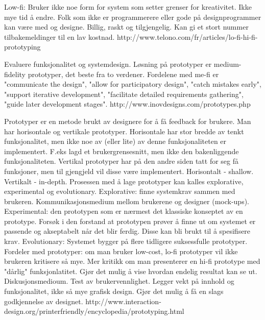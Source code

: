 Low-fi: Bruker ikke noe form for system som setter grenser for kreativitet. Ikke mye tid å endre. Folk som ikke er programmerere eller gode på designprogrammer kan være med og designe. Billig, raskt og tilgjengelig. Kan gi et stort nummer tilbakemeldinger til en lav kostnad. http://www.telono.com/fr/articles/lo-fi-hi-fi-prototyping

Evaluere funksjonalitet og systemdesign. Løsning på prototyper er medium-fidelity prototyper, det beste fra to verdener. Fordelene med me-fi er "communicate the design", "allow for participatory design", "catch mistakes early", "support iterative development", "facilitate detailed requirements gathering", "guide later development stages". http://www.inovdesigns.com/prototypes.php 

Prototyper er en metode brukt av designere for å få feedback for brukere. Man har horisontale og vertikale prototyper. Horisontale har stor bredde av tenkt funksjonalitet, men ikke noe av (eller lite) av denne funksjonaliteten er implementert. F.eks lagd et brukergrensesnitt, men ikke den bakenliggende funksjonaliteten. Vertikal prototyper har på den andre siden tatt for seg få funksjoner, men til gjengjeld vil disse være implementert. Horisontalt - shallow. Vertikalt - in-depth. Prosessen med å lage prototyper kan kalles explorative, experimental og evolutionary. Explorative: finne systemkrav sammen med brukeren. Kommunikasjonsmedium mellom brukerene og designer (mock-ups). Experimental: den prototypen som er nærmest det klassiske konseptet av en prototype. Forsøk i den forstand at prototypen prøver å finne ut om systemet er passende og akseptabelt når det blir ferdig. Disse kan bli brukt til å spesifisere krav. Evolutionary: Systemet bygger på flere tidligere suksessfulle prototyper. Fordeler med prototyper: om man bruker low-cost, lo-fi prototyper vil ikke brukeren kritisere så mye. Mer kritikk om man presenterer en hi-fi prototype med "dårlig" funksjonlatitet. Gjør det mulig å vise hvordan endelig resultat kan se ut. Diskusjonsmedioum. Test av brukervennlighet. Legger vekt på innhold og funksjonalitet, ikke så mye grafisk design. Gjør det mulig å få en slags godkjennelse av designet. http://www.interaction-design.org/printerfriendly/encyclopedia/prototyping.html

